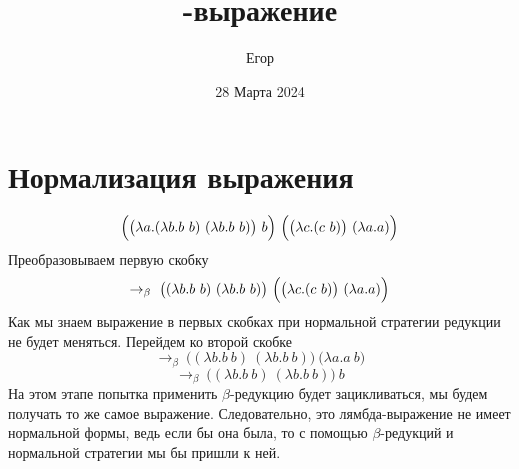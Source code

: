 \documentclass{article}
\title{\hugeЛямбда-выражение}
\author{\LARGEШишкарев Егор}
\date{\large28 Марта 2024}
\begin{document}
\maketitle
\section{Нормализация выражения}
\fontsize{14}{14}\selectfont
\begin{equation}
    \Bigl(\bigl(\lambda a.(\lambda b.b~b)~(\lambda b.b~b)\bigr)~b\Bigr)~\Bigl(\bigl(\lambda c.(c~b)\bigr)~(\lambda a.a)\Bigr)  
\end{equation}
Преобразовываем первую скобку
\begin{equation}
    \rightarrow_\beta~
    \bigl((\lambda b.b~b)~(\lambda b.b~b)\bigr)~\Bigl(\bigl(\lambda c.(c~b)\bigr)~(\lambda a.a)\Bigr) 
\end{equation}
Как мы знаем выражение в первых скобках при нормальной стратегии редукции не будет меняться. Перейдем ко второй скобке
\begin{equation}
    \rightarrow_\beta~
    \bigl((\lambda b.b~b)~(\lambda b.b~b)\bigr)~\bigl(\lambda a.a~b\bigr) 
\end{equation}
\begin{equation}
    \rightarrow_\beta~
    \bigl((\lambda b.b~b)~(\lambda b.b~b)\bigr)~b
\end{equation}
На этом этапе попытка применить $\beta$-редукцию будет зацикливаться, мы будем получать то же самое выражение. Следовательно, это лямбда-выражение не имеет нормальной формы, ведь если бы она была, то с помощью $\beta$-редукций и нормальной стратегии мы бы пришли к ней.
\end{document}
